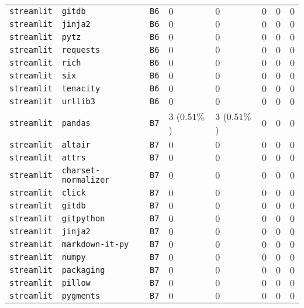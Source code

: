 \begin{table}
\begin{tabular}{llllllll}
\texttt{streamlit} & \texttt{gitdb} & \texttt{B6} & $0$ & $0$ & $0$ & $0$ & $0$ \\
\texttt{streamlit} & \texttt{jinja2} & \texttt{B6} & $0$ & $0$ & $0$ & $0$ & $0$ \\
\texttt{streamlit} & \texttt{pytz} & \texttt{B6} & $0$ & $0$ & $0$ & $0$ & $0$ \\
\texttt{streamlit} & \texttt{requests} & \texttt{B6} & $0$ & $0$ & $0$ & $0$ & $0$ \\
\texttt{streamlit} & \texttt{rich} & \texttt{B6} & $0$ & $0$ & $0$ & $0$ & $0$ \\
\texttt{streamlit} & \texttt{six} & \texttt{B6} & $0$ & $0$ & $0$ & $0$ & $0$ \\
\texttt{streamlit} & \texttt{tenacity} & \texttt{B6} & $0$ & $0$ & $0$ & $0$ & $0$ \\
\texttt{streamlit} & \texttt{urllib3} & \texttt{B6} & $0$ & $0$ & $0$ & $0$ & $0$ \\
\texttt{streamlit} & \texttt{pandas} & \texttt{B7} & $3$ ($0.51\%$) & $3$ ($0.51\%$) & $0$ & $0$ & $0$ \\
\texttt{streamlit} & \texttt{altair} & \texttt{B7} & $0$ & $0$ & $0$ & $0$ & $0$ \\
\texttt{streamlit} & \texttt{attrs} & \texttt{B7} & $0$ & $0$ & $0$ & $0$ & $0$ \\
\texttt{streamlit} & \texttt{charset-normalizer} & \texttt{B7} & $0$ & $0$ & $0$ & $0$ & $0$ \\
\texttt{streamlit} & \texttt{click} & \texttt{B7} & $0$ & $0$ & $0$ & $0$ & $0$ \\
\texttt{streamlit} & \texttt{gitdb} & \texttt{B7} & $0$ & $0$ & $0$ & $0$ & $0$ \\
\texttt{streamlit} & \texttt{gitpython} & \texttt{B7} & $0$ & $0$ & $0$ & $0$ & $0$ \\
\texttt{streamlit} & \texttt{jinja2} & \texttt{B7} & $0$ & $0$ & $0$ & $0$ & $0$ \\
\texttt{streamlit} & \texttt{markdown-it-py} & \texttt{B7} & $0$ & $0$ & $0$ & $0$ & $0$ \\
\texttt{streamlit} & \texttt{numpy} & \texttt{B7} & $0$ & $0$ & $0$ & $0$ & $0$ \\
\texttt{streamlit} & \texttt{packaging} & \texttt{B7} & $0$ & $0$ & $0$ & $0$ & $0$ \\
\texttt{streamlit} & \texttt{pillow} & \texttt{B7} & $0$ & $0$ & $0$ & $0$ & $0$ \\
\texttt{streamlit} & \texttt{pygments} & \texttt{B7} & $0$ & $0$ & $0$ & $0$ & $0$ \\

\end{tabular}
\end{table}
